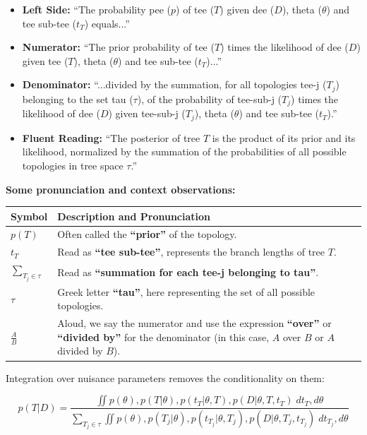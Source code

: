 \begin{itemize}
    \item \textbf{Left Side:} ``The probability pee ($p$) of tee ($T$) given dee ($D$), theta ($\theta$) and tee sub-tee ($t_T$) equals...''
    \item \textbf{Numerator:} ``The prior probability of tee ($T$) times the likelihood of dee ($D$) given tee ($T$), theta ($\theta$) and tee sub-tee ($t_T$)...''
    \item \textbf{Denominator:} ``...divided by the summation, for all topologies tee-j ($T_j$) belonging to the set tau ($\tau$), of the probability of tee-sub-j ($T_j$) times the likelihood of dee ($D$) given tee-sub-j ($T_j$), theta ($\theta$) and tee sub-tee ($t_T$).''
    \item \textbf{Fluent Reading:} ``The posterior of tree $T$ is the product of its prior and its likelihood, normalized by the summation of the probabilities of all possible topologies in tree space $\tau$.''
\end{itemize}

\vspace{0.5cm}

\textbf{Some pronunciation and context observations:}

\begin{center}
\renewcommand{\arraystretch}{1.5}
\begin{tabular}{lp{10cm}}
\hline
\textbf{Symbol} & \textbf{Description and Pronunciation} \\ \hline
$p(T)$ & Often called the \textbf{``prior''} of the topology. \\
$t_T$ & Read as \textbf{``tee sub-tee''}, represents the branch lengths of tree $T$. \\
$\sum_{T_j \in \tau}$ & Read as \textbf{``summation for each tee-j belonging to tau''}. \\
$\tau$ & Greek letter \textbf{``tau''}, here representing the set of all possible topologies. \\
$\frac{A}{B}$ & Aloud, we say the numerator and use the expression \textbf{``over''} or \textbf{``divided by''} for the denominator (in this case, $A$ over $B$ or $A$ divided by $B$). \\ \hline
\end{tabular}
\end{center}

Integration over nuisance parameters removes the conditionality on them:

$$p(T|D) = \frac{\iint p(\theta), p(T|\theta), p(t_T|\theta, T), p(D|\theta, T, t_T)\; dt_T, d\theta}{\sum_{T_j \in \tau} \iint p(\theta), p(T_j|\theta), p(t_{T_j}|\theta, T_j), p(D|\theta, T_j, t_{T_j})\; dt_{T_j}, d\theta}$$

